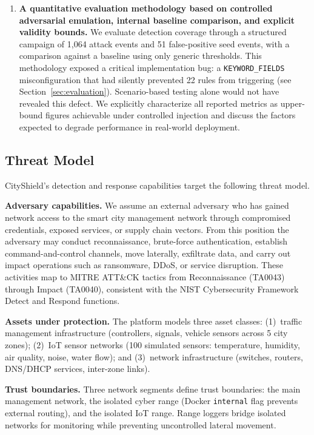 \documentclass[conference,10pt]{IEEEtran}
\begin{document}
\begin{enumerate}[leftmargin=*]
    \item \textbf{A quantitative evaluation methodology based on controlled adversarial emulation, internal baseline comparison, and explicit validity bounds.} We evaluate detection coverage through a structured campaign of 1,064 attack events and 51 false-positive seed events, with a comparison against a baseline using only generic thresholds. This methodology exposed a critical implementation bug: a \texttt{KEYWORD\_FIELDS} misconfiguration that had silently prevented 22 rules from triggering (see Section~\ref{sec:evaluation}). Scenario-based testing alone would not have revealed this defect. We explicitly characterize all reported metrics as upper-bound figures achievable under controlled injection and discuss the factors expected to degrade performance in real-world deployment.
\end{enumerate}

\subsection{Threat Model}
\label{subsec:threat_model}

CityShield's detection and response capabilities target the following threat model.

\textbf{Adversary capabilities.} We assume an external adversary who has gained network access to the smart city management network through compromised credentials, exposed services, or supply chain vectors. From this position the adversary may conduct reconnaissance, brute-force authentication, establish command-and-control channels, move laterally, exfiltrate data, and carry out impact operations such as ransomware, DDoS, or service disruption. These activities map to MITRE ATT\&CK tactics from Reconnaissance (TA0043) through Impact (TA0040), consistent with the NIST Cybersecurity Framework~\cite{nist_framework} Detect and Respond functions.

\textbf{Assets under protection.} The platform models three asset classes: (1)~traffic management infrastructure (controllers, signals, vehicle sensors across 5 city zones); (2)~IoT sensor networks (100 simulated sensors: temperature, humidity, air quality, noise, water flow); and (3)~network infrastructure (switches, routers, DNS/DHCP services, inter-zone links).

\textbf{Trust boundaries.} Three network segments define trust boundaries: the main management network, the isolated cyber range (Docker \texttt{internal} flag prevents external routing), and the isolated IoT range. Range loggers bridge isolated networks for monitoring while preventing uncontrolled lateral movement.
\end{document}
